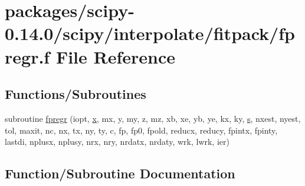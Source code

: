 \hypertarget{fpregr_8f}{}\section{packages/scipy-\/0.14.0/scipy/interpolate/fitpack/fpregr.f File Reference}
\label{fpregr_8f}
\subsection*{Functions/\+Subroutines}
\begin{DoxyCompactItemize}
\item 
subroutine \hyperlink{fpregr_8f_adafb731184d2790f568095191bc5a417}{fpregr} (iopt, \hyperlink{vecnorm1_8cc_ac73eed9e41ec09d58f112f06c2d6cb63}{x}, mx, y, my, z, mz, xb, xe, yb, ye, kx, ky, \hyperlink{indexexpr_8h_ae024b0db549122b44c349ae28ec990dc}{s}, nxest, nyest, tol, maxit, nc, nx, tx, ny, ty, c, fp, fp0, fpold, reducx, reducy, fpintx, fpinty, lastdi, nplusx, nplusy, nrx, nry, nrdatx, nrdaty, wrk, lwrk, ier)
\end{DoxyCompactItemize}


\subsection{Function/\+Subroutine Documentation}
\hypertarget{fpregr_8f_adafb731184d2790f568095191bc5a417}{}
